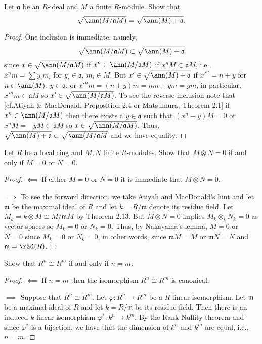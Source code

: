 \begin{problem}
Let $\mathfrak{a}$ be an $R$-ideal and $M$ a finite
$R$-module. Show that
\[
\sqrt{\ann(M/\mathfrak{a}M)}=\sqrt{\ann(M)+\mathfrak{a}}.
\]
\end{problem}
\begin{proof}
One inclusion is immediate, namely,
\[
\sqrt{\ann(M/\mathfrak{a}M)}\subset\sqrt{\ann(M)+\mathfrak{a}}
\]
since $x\in\sqrt{\ann(M/\mathfrak{a}M)}$ if
$x^n\in\ann(M/\mathfrak{a}M)$ if $x^nM\subset\mathfrak{a}M$,
i.e., $x^nm=\sum y_im_i$ for $y_i\in\mathfrak{a}$, $m_i\in
M$. But $x'\in\sqrt{\ann(M)+\mathfrak{a}}$ if $x'^n=n+y$ for
$n\in\ann(M)$, $y\in\mathfrak{a}$, or $x'^nm=(n+y)m=nm+ym=ym$, in
particular, $x'^nm\in\mathfrak{a}M$ so
$x'\in\sqrt{\ann(M/\mathfrak{a}M)}$. To see the reverse inclusion
note that [cf.Atiyah \& MacDonald, Proposition 2.4 or Matsumura,
Theorem 2.1] if $x^n\in\ann(M/\mathfrak{a}M)$ then there exists a
$y\in\mathfrak{a}$ such that $(x^n+y)M=0$ or
$x^nM=-yM\subset\mathfrak{a}M$ so
$x\in\sqrt{\ann(M/\mathfrak{a}M)}$. Thus,
$\sqrt{\ann(M)+\mathfrak{a}}\subset\sqrt{\ann(M/\mathfrak{a}M}$
and we have equality.
\end{proof}
\newpage
\begin{problem}
Let $R$ be a local ring and $M,N$ finite $R$-modules. Show that
$M\otimes N=0$ if and only if $M=0$ or $N=0$.
\end{problem}
\begin{proof}
$\impliedby$ If either $M=0$ or $N=0$ it is immediate that
$M\otimes N=0$.

$\implies$ To see the forward direction, we take Atiyah and
MacDonald's hint and let $\mathfrak{m}$ be the maximal ideal of
$R$ and let $k=R/\mathfrak{m}$ denote its residue field. Let
$M_k=k\otimes M\cong M/\mathfrak{m}M$ by Theorem 2.13. But
$M\otimes N=0$ implies $M_k\otimes_k N_k=0$ as vector spaces so
$M_k=0$ or $N_k=0$. Thus, by Nakayama's lemma, $M=0$ or $N=0$
since $M_k=0$ or $N_k=0$, in other words, since $\mathfrak{m}M=M$
or $\mathfrak{m}N=N$ and $\mathfrak{m}=\rad(R)$.
\end{proof}
\newpage
\begin{problem}
Show that $R^n\cong R^m$ if and only if $n=m$.
\end{problem}
\begin{proof}
$\impliedby$ If $n=m$ then the isomorphism $R^n\cong R^m$ is
canonical.

$\implies$ Suppose that $R^n\cong R^m$. Let $\varphi\colon R^n\to
R^m$ be a $R$-linear isomorphism. Let $\mathfrak{m}$ be a maximal
ideal of $R$ and let $k=R/\mathfrak{m}$ be its residue
field. Then there is an induced $k$-linear isomorphism
$\varphi^*\colon k^n\to k^m$. By the Rank-Nullity theorem and
since $\varphi^*$ is a bijection, we have that the dimension of
$k^n$ and $k^m$ are equal, i.e., $n=m$.
\end{proof}
